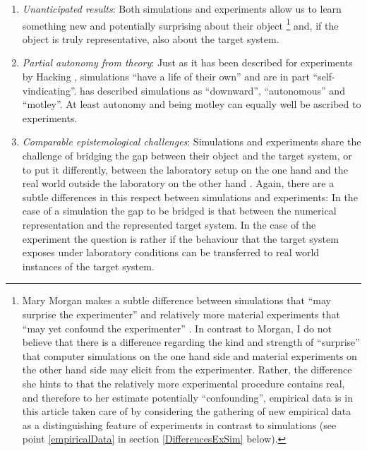 \documentclass[onecollarge]{STJour}
\numberwithin{equation}{section}
\begin{document}
\begin{enumerate}
\item {\em Unanticipated results}: Both simulations and experiments allow us to learn something new and potentially surprising about their object \citep[p. 224]{morgan:2003}\footnote{Mary Morgan makes a subtle difference between simulations that ``may surprise the experimenter'' and relatively more material experiments that ``may yet confound the experimenter'' \citep{morgan:2003}. In contrast to Morgan, I do not believe that there is a difference regarding the kind and strength of ``surprise'' that computer simulations on the one hand side and material experiments on the other hand side may elicit from the experimenter. Rather, the difference she hints to that the relatively more experimental procedure contains real, and therefore to her estimate potentially ``confounding'', empirical data is in this article taken care of by considering the gathering of new empirical data as a distinguishing feature of experiments in contrast to simulations (see point \ref{empiricalData} in section \ref{DifferencesExSim} below).} and, if the object is truly representative, also about the target system.

\item {\em Partial autonomy from theory}: Just as it has been described for experiments by Hacking \citep{hacking:1983}, simulations ``have a life of their own'' and are in part ``self-vindicating''\citep[p. 45]{winsberg:2010}. \citet[p. 447]{winsberg:2001} has described simulations as ``downward'', ``autonomous'' and ``motley''. At least autonomy and being motley can equally well be ascribed to experiments.

\item {\em Comparable epistemological challenges}: Simulations and experiments share the challenge of bridging the gap between their object and the target system, or to put it differently, between the laboratory setup on the one hand and the real world outside the laboratory on the other hand \citep[p. 174/175]{arnold:2008}. Again, there are a subtle differences in this respect between simulations and experiments: In the case of a simulation the gap to be bridged is that between the numerical representation and the represented target system. In the case of the experiment the question is rather if the behaviour that the target system exposes under laboratory conditions can be transferred to real world instances of the target system.
  
\end{enumerate}
\end{document}

